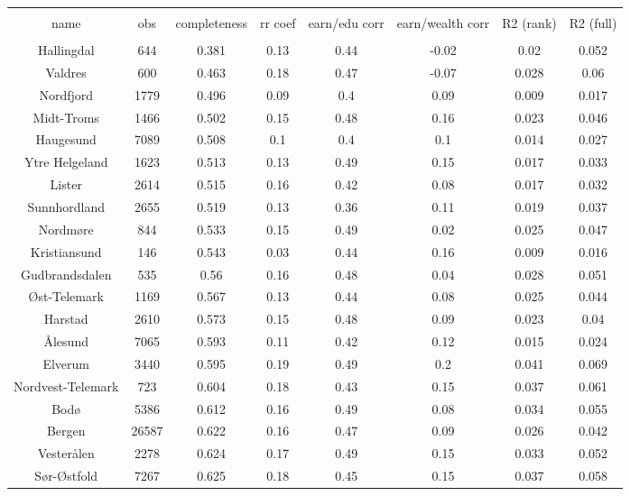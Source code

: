 
\begin{tabular}{@{\extracolsep{2pt}} cccccccc} 
\\[-1.8ex]\hline 
\hline \\[-1.8ex] 
name & obs & completeness & rr coef & earn/edu corr & earn/wealth corr & R2 (rank) & R2 (full) \\ 
\hline \\[-1.8ex] 
Hallingdal & 644 & 0.381 & 0.13 & 0.44 & -0.02 & 0.02 & 0.052 \\ 
Valdres & 600 & 0.463 & 0.18 & 0.47 & -0.07 & 0.028 & 0.06 \\ 
Nordfjord & 1779 & 0.496 & 0.09 & 0.4 & 0.09 & 0.009 & 0.017 \\ 
Midt-Troms & 1466 & 0.502 & 0.15 & 0.48 & 0.16 & 0.023 & 0.046 \\ 
Haugesund & 7089 & 0.508 & 0.1 & 0.4 & 0.1 & 0.014 & 0.027 \\ 
Ytre Helgeland & 1623 & 0.513 & 0.13 & 0.49 & 0.15 & 0.017 & 0.033 \\ 
Lister & 2614 & 0.515 & 0.16 & 0.42 & 0.08 & 0.017 & 0.032 \\ 
Sunnhordland & 2655 & 0.519 & 0.13 & 0.36 & 0.11 & 0.019 & 0.037 \\ 
Nordmøre & 844 & 0.533 & 0.15 & 0.49 & 0.02 & 0.025 & 0.047 \\ 
Kristiansund & 146 & 0.543 & 0.03 & 0.44 & 0.16 & 0.009 & 0.016 \\ 
Gudbrandsdalen & 535 & 0.56 & 0.16 & 0.48 & 0.04 & 0.028 & 0.051 \\ 
Øst-Telemark & 1169 & 0.567 & 0.13 & 0.44 & 0.08 & 0.025 & 0.044 \\ 
Harstad & 2610 & 0.573 & 0.15 & 0.48 & 0.09 & 0.023 & 0.04 \\ 
Ålesund & 7065 & 0.593 & 0.11 & 0.42 & 0.12 & 0.015 & 0.024 \\ 
Elverum & 3440 & 0.595 & 0.19 & 0.49 & 0.2 & 0.041 & 0.069 \\ 
Nordvest-Telemark & 723 & 0.604 & 0.18 & 0.43 & 0.15 & 0.037 & 0.061 \\ 
Bodø & 5386 & 0.612 & 0.16 & 0.49 & 0.08 & 0.034 & 0.055 \\ 
Bergen & 26587 & 0.622 & 0.16 & 0.47 & 0.09 & 0.026 & 0.042 \\ 
Vesterålen & 2278 & 0.624 & 0.17 & 0.49 & 0.15 & 0.033 & 0.052 \\ 
Sør-Østfold & 7267 & 0.625 & 0.18 & 0.45 & 0.15 & 0.037 & 0.058 \\ 

\end{tabular}
